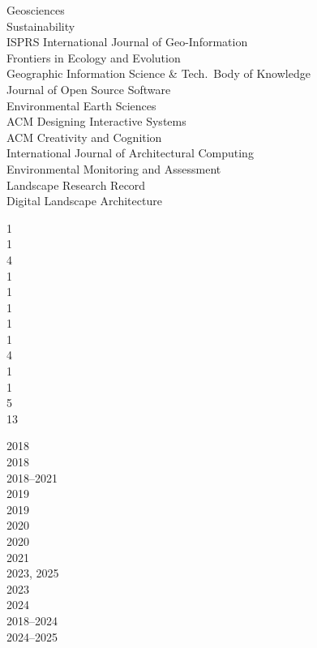 \documentclass[10pt]{designcv}
\begin{document}
\begin{minipage}[t]{0.65\textwidth}
Geosciences\\
Sustainability\\
ISPRS International Journal of Geo-Information\\
Frontiers in Ecology and Evolution\\
Geographic Information Science \& Tech.~Body of Knowledge\\
Journal of Open Source Software\\
Environmental Earth Sciences\\
ACM Designing Interactive Systems\\
ACM Creativity and Cognition\\
International Journal of Architectural Computing\\
Environmental Monitoring and Assessment\\
Landscape Research Record\\
Digital Landscape Architecture\\
\end{minipage}
\hfill
\begin{minipage}[t]{0.05\textwidth}
1\\
1\\
4\\
1\\
1\\
1\\
1\\
1\\
4\\
1\\
1\\
5\\
13\\
\end{minipage}
\hfill
\begin{minipage}[t]{0.15\textwidth}
2018\\
2018\\
2018--2021\\
2019\\
2019\\
2020\\
2020\\
2021\\
2023, 2025\\
2023\\
2024\\
2018--2024\\
2024--2025\\
\end{minipage}
\end{document}
